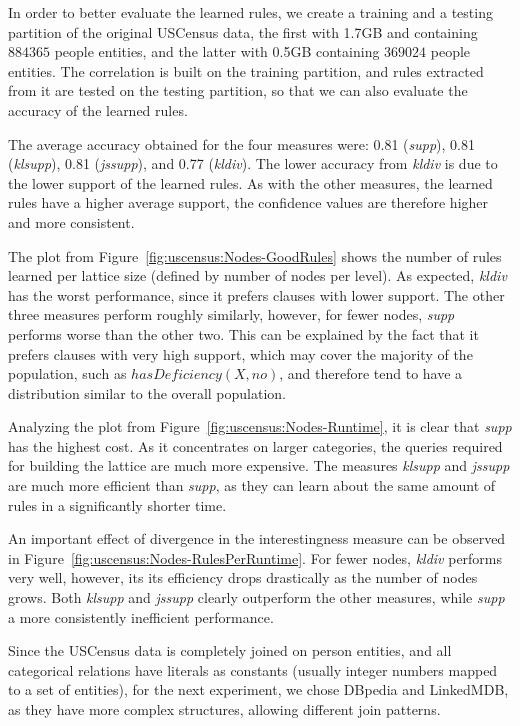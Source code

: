 In order to better evaluate the learned rules, we create a training and a testing partition of the original
USCensus data, the first with 1.7GB and containing $884365$ people entities, and the latter with 0.5GB containing
$369024$ people entities. The correlation is built on the training partition, and rules extracted from it are tested on
the testing partition, so that we can also evaluate the accuracy of the learned rules.

The average accuracy obtained for the four measures were: 0.81 (\emph{supp}), 0.81 (\emph{klsupp}), 0.81
(\emph{jssupp}), and 0.77 (\emph{kldiv}). The lower accuracy from \emph{kldiv} is due to the lower support of the
learned rules. As with the other measures, the learned rules have a higher average support, the confidence values are
therefore higher and more consistent.

The plot from Figure~\ref{fig:uscensus:Nodes-GoodRules} shows the number of rules learned per lattice size (defined by
number of nodes per level). As expected, \emph{kldiv} has the worst performance, since it prefers clauses with lower
support. The other three measures perform roughly similarly, however, for
fewer nodes, \emph{supp} performs worse than the other two. This can be explained by the fact that it prefers
clauses with very high support, which may cover the majority of the population, such as $hasDeficiency(X,no)$, and
therefore tend to have a distribution similar to the overall population. 

Analyzing the plot from Figure~\ref{fig:uscensus:Nodes-Runtime}, it is clear that \emph{supp} has the highest cost. As
it concentrates on larger categories, the queries required for building the lattice are much
more expensive. The measures \emph{klsupp} and \emph{jssupp} are much more efficient than \emph{supp},
as they can learn about the same amount of rules in a significantly shorter time.

An important effect of divergence in the interestingness measure can be observed
in Figure~\ref{fig:uscensus:Nodes-RulesPerRuntime}. For fewer nodes, \emph{kldiv} performs very well, however, its
its efficiency drops drastically as the number of nodes grows. Both \emph{klsupp} and \emph{jssupp} clearly outperform
the other measures, while \emph{supp} a more consistently inefficient performance.

Since the USCensus data is completely joined on person entities, and all categorical relations have literals
as constants (usually integer numbers mapped to a set of entities), for the next experiment, we chose DBpedia and
LinkedMDB, as they have more complex structures, allowing different join patterns.

